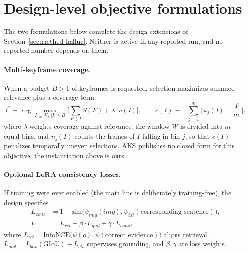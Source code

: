 \section{Design-level objective formulations}\label{app:lora}

The two formulations below complete the design extensions of Section~\ref{sec:method-halluc}. Neither is active in any reported run, and no reported number depends on them.

\paragraph{Multi-keyframe coverage.} When a budget $B > 1$ of keyframes is requested, selection maximizes summed relevance plus a coverage term:
\begin{equation}
I^* = \arg\max_{I \subseteq W,\, |I| \le B} \Big[ \sum_{F \in I} S(F) + \lambda \cdot c(I) \Big], \qquad c(I) = -\sum_{j=1}^{m} \Big|\, n_j(I) - \frac{|I|}{m} \,\Big|,
\end{equation}
where $\lambda$ weights coverage against relevance, the window $W$ is divided into $m$ equal bins, and $n_j(I)$ counts the frames of $I$ falling in bin $j$, so that $c(I)$ penalizes temporally uneven selections. AKS \citep{aks2502} publishes no closed form for this objective; the instantiation above is ours.

\paragraph{Optional LoRA consistency losses.} If training were ever enabled (the main line is deliberately training-free), the design specifies
\begin{align}
L_{cons} &= 1 - \mathrm{sim}\big(\psi_{img}(img), \psi_{txt}(\text{corresponding sentence})\big), \\
L &= L_{ret} + \beta \cdot L_{gnd} + \gamma \cdot L_{cons},
\end{align}
where $L_{ret} = \mathrm{InfoNCE}\big(\psi(o), \psi(\text{correct evidence})\big)$ aligns retrieval, $L_{gnd} = L_{box}(\mathrm{GIoU}) + L_{cls}$ supervises grounding, and $\beta, \gamma$ are loss weights.
